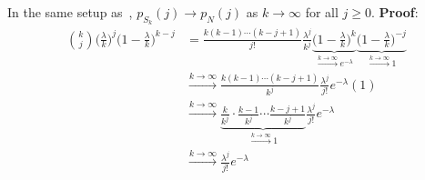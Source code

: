 \begin{Proposition}{}{}
    In the same setup as~,
    $ p_{S_k}(j)\to p_N(j) $ as $ k\to\infty $
    for all $ j\ge 0 $.
    \tcblower{}
    \textbf{Proof}:
    \begin{align*}
        \binom{k}{j}\biggl(\frac{\lambda}{k}\biggr)^j
        \biggl(1-\frac{\lambda}{k}\biggr)^{k-j}
         & =\frac{k(k-1)\cdots (k-j+1)}{j!}\frac{\lambda^j}{k^j}
        \underbrace{\biggl(1-\frac{\lambda}{k}\biggr)^k}_{\xrightarrow{k\to\infty} e^{-\lambda}} \underbrace{\biggl(1-\frac{\lambda}{k}\biggr)^{-j}}_{\xrightarrow{k\to\infty} 1} \\
         & \xrightarrow{k\to\infty}\frac{k(k-1)\cdots (k-j+1)}{k^j}\frac{\lambda^j}{j!}e^{-\lambda}(1)                                                                            \\
         & \xrightarrow{k\to\infty}\underbrace{\frac{k}{k^j}\cdot \frac{k-1}{k^j}\cdots
        \frac{k-j+1}{k^j}}_{\xrightarrow{k\to\infty} 1} \frac{\lambda^j}{j!}e^{-\lambda}                                                                                          \\
         & \xrightarrow{k\to\infty}\frac{\lambda^j}{j!}e^{-\lambda}                                                                                                               \\
    \end{align*}
\end{Proposition}